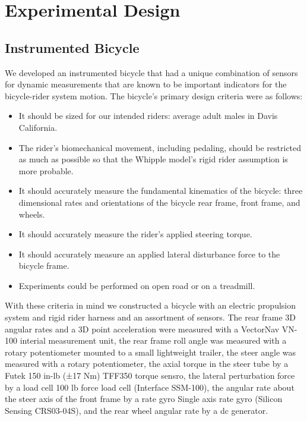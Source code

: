 \documentclass[a4paper]{article}
\begin{document}
\section{Experimental Design}

\subsection{Instrumented Bicycle}
We developed an instrumented bicycle that had a unique combination of sensors
for dynamic measurements that are known to be important indicators for the
bicycle-rider system motion. The bicycle's primary design criteria were as
follows:

\begin{itemize}
  \item It should be sized for our intended riders: average adult males in
    Davis California. %
  \item The rider's biomechanical movement, including pedaling, should be
    restricted as much as possible so that the Whipple model's rigid rider
    assumption is more probable.
  \item It %
  should accurately measure the fundamental kinematics of the bicycle:
    three dimensional rates and orientations of the bicycle rear frame, front
    frame, and wheels.
  \item It should accurately measure the rider's applied steering torque.
  \item It should accurately measure an applied lateral disturbance force to
    the bicycle frame.
  \item Experiments could be performed on open road or on a treadmill.
\end{itemize}

With these criteria in mind we constructed a bicycle with an electric
propulsion system and rigid rider harness and an assortment of sensors. The
rear frame 3D angular rates and a 3D point acceleration were measured with a
VectorNav VN-100 interial measurement unit, the rear frame roll angle was
measured with a rotary potentiometer mounted to a small lightweight trailer,
the steer angle was measured with a rotary potentiometer, the axial torque in
the steer tube by a Futek 150 in-lb (±17 Nm) TFF350 torque sensro, the lateral
perturbation force by a load cell 100 lb force load cell (Interface SSM-100),
the angular rate about the steer axis of the front frame by a rate gyro Single
axis rate gyro (Silicon Sensing CRS03-04S), and the rear wheel angular rate by
a dc generator.
\end{document}
